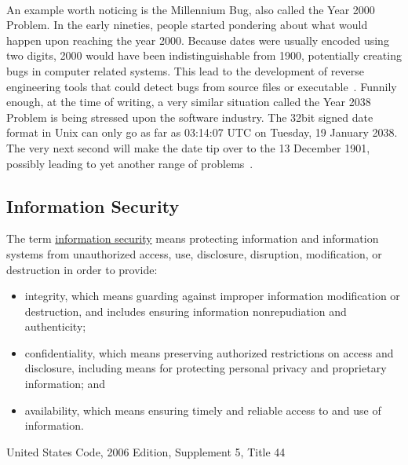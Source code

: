 \paragraph{}
An example worth noticing is the Millennium Bug, also called the Year 2000 Problem. In the early nineties, people started pondering about what would happen upon reaching the year 2000. Because dates were usually encoded using two digits, 2000 would have been indistinguishable from 1900, potentially creating bugs in computer related systems. This lead to the development of reverse engineering tools that could detect bugs from source files or executable~\cite{reps1997use}. Funnily enough, at the time of writing, a very similar situation called the Year 2038 Problem is being stressed upon the software industry. The 32bit signed date format in Unix can only go as far as 03:14:07 UTC on Tuesday, 19 January 2038. The very next second will make the date tip over to the 13 December 1901, possibly leading to yet another range of problems~\cite{wiki:year2038problem}.

\subsection{Information Security}
\begin{framed}
	\begin{definition}
		The term \underline{information security} means protecting information and information systems from unauthorized access, use, disclosure, disruption, modification, or destruction in order to provide:
		\begin{itemize}
			\item integrity, which means guarding against improper information modification or destruction, and includes ensuring information nonrepudiation and authenticity; 
			\item confidentiality, which means preserving authorized restrictions on access and disclosure, including means for protecting personal privacy and proprietary information; and  
			\item availability, which means ensuring timely and reliable access to and use of information.
		\end{itemize}
		\begin{flushright}
			\hfill{}{United States Code, 2006 Edition, Supplement 5, Title 44~\cite{uscode_t44}}
		\end{flushright}
	\end{definition}
\end{framed}

